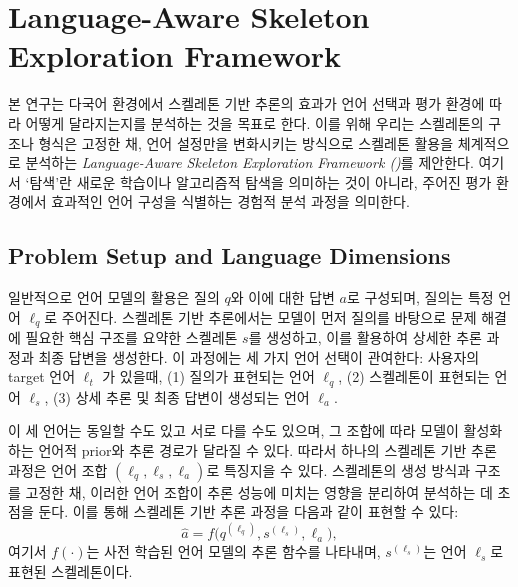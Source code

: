 


\section{Language-Aware Skeleton Exploration Framework}

본 연구는 다국어 환경에서 스켈레톤 기반 추론의 효과가 언어 선택과 평가 환경에 따라 어떻게 달라지는지를 분석하는 것을 목표로 한다. 이를 위해 우리는 스켈레톤의 구조나 형식은 고정한 채, 언어 설정만을 변화시키는 방식으로 스켈레톤 활용을 체계적으로 분석하는 \emph{Language-Aware Skeleton Exploration Framework (\LASEF)}를 제안한다. 여기서 `탐색'란 새로운 학습이나 알고리즘적 탐색을 의미하는 것이 아니라, 주어진 평가 환경에서 효과적인 언어 구성을 식별하는 경험적 분석 과정을 의미한다.


\subsection{Problem Setup and Language Dimensions}


일반적으로 언어 모델의 활용은 질의 $q$와 이에 대한 답변 $a$로 구성되며, 질의는 특정 언어 $\ell_q$로 주어진다. 스켈레톤 기반 추론에서는 모델이 먼저 질의를 바탕으로 문제 해결에 필요한 핵심 구조를 요약한 스켈레톤 $s$를 생성하고, 이를 활용하여 상세한 추론 과정과 최종 답변을 생성한다. 이 과정에는 세 가지 언어 선택이 관여한다: 사용자의 target 언어 $\ell_t$ 가 있을때, (1) 질의가 표현되는 언어 $\ell_q$, (2) 스켈레톤이 표현되는 언어 $\ell_s$, (3) 상세 추론 및 최종 답변이 생성되는 언어 $\ell_a$.

이 세 언어는 동일할 수도 있고 서로 다를 수도 있으며, 그 조합에 따라 모델이 활성화하는 언어적 prior와 추론 경로가 달라질 수 있다. 따라서 하나의 스켈레톤 기반 추론 과정은 언어 조합 $(\ell_q, \ell_s, \ell_a)$로 특징지을 수 있다.  스켈레톤의 생성 방식과 구조를 고정한 채, 이러한 언어 조합이 추론 성능에 미치는 영향을 분리하여 분석하는 데 초점을 둔다. 이를 통해 스켈레톤 기반 추론 과정을 다음과 같이 표현할 수 있다:
\[
\hat{a} = f\big(q^{(\ell_q)}, s^{(\ell_s)}, \ell_a\big),
\]
여기서 $f(\cdot)$는 사전 학습된 언어 모델의 추론 함수를 나타내며, $s^{(\ell_s)}$는 언어 $\ell_s$로 표현된 스켈레톤이다.

